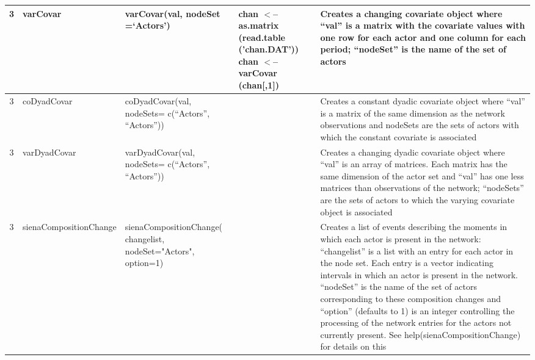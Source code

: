 \documentclass[a4paper,fleqn]{article}
\newcommand{\+}{\, + \,}
\begin{document}
{\begin{landscape}
\begin{longtable}{c | p{3cm} | p{5.2cm} | p{4.2cm} | p{8.5cm} }
3 & varCovar & varCovar(val, \newline
nodeSet =`Actors') & chan $<$-- as.matrix \newline
(read.table ('chan.DAT')) \newline chan $<$-- \newline
varCovar (chan[,1]) & Creates a
changing covariate object where ``val'' is a matrix with the covariate values
with one row for each actor and one column for each period; ``nodeSet'' is the
name of the set of actors \\
\hline

3& coDyadCovar &coDyadCovar(val, \newline
nodeSets= \newline
c(``Actors'', ``Actors'')) & &
Creates a constant dyadic covariate object where ``val'' is a matrix of the
same dimension as the network observations and nodeSets are the sets of actors
with
which the constant covariate is associated\\
\hline

3 &varDyadCovar & varDyadCovar(val, \newline
nodeSets= \newline
c(``Actors'', ``Actors'')) &
&Creates a changing dyadic covariate object where ``val'' is an array of
matrices. Each matrix has the same dimension of the actor set and ``val'' has
one less matrices than observations of the network; ``nodeSets'' are the sets
of actors to which the varying covariate object is associated\\
\hline

3 & sienaCompositionChange & \newline
sienaCompositionChange( changelist,\newline
nodeSet="Actors", \newline
option=1) & & Creates a list of events describing the moments
in which each actor is present in the network: ``changelist'' is a list with an
entry for each actor in the node set. Each entry is a vector indicating
intervals in which an actor is present in the network. ``nodeSet'' is the name
of the set of actors corresponding to these composition changes and ``option''
(defaults to 1) is an integer controlling the processing of the network entries
for the actors not currently present. See help(sienaCompositionChange) for
details on this\\
\hline


\end{longtable}
\end{landscape}}
\end{document}
